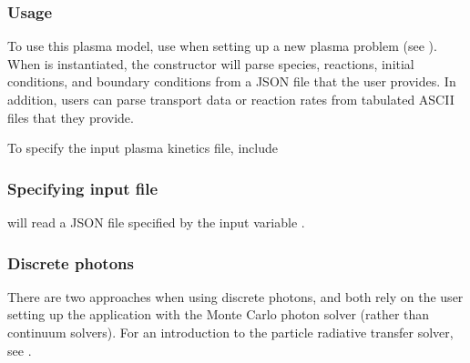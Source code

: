 \documentclass[letterpaper,10pt,english]{sphinxmanual}
\begin{document}
\subsubsection{Usage}
\label{\detokenize{Applications/CdrPlasmaModel:usage}}
\sphinxAtStartPar
To use this plasma model, use  when setting up a new plasma problem (see {\hyperref[\detokenize{Applications/CdrPlasmaModel:chap-cdrplasmanewproblem}]{}}).
When  is instantiated, the constructor will parse species, reactions, initial conditions, and boundary conditions from a JSON file that the user provides.
In addition, users can parse transport data or reaction rates from tabulated ASCII files that they provide.

\sphinxAtStartPar
To specify the input plasma kinetics file, include


\subsubsection{Specifying input file}
\label{\detokenize{Applications/CdrPlasmaModel:specifying-input-file}}
\sphinxAtStartPar
{} will read a JSON file specified by the input variable .


\subsubsection{Discrete photons}
\label{\detokenize{Applications/CdrPlasmaModel:discrete-photons}}
\sphinxAtStartPar
There are two approaches when using discrete photons, and both rely on the user setting up the application with the Monte Carlo photon solver (rather than continuum solvers).
For an introduction to the particle radiative transfer solver, see {\hyperref[\detokenize{Solvers/RTE:chap-montecarlorte}]{}}.
\end{document}

